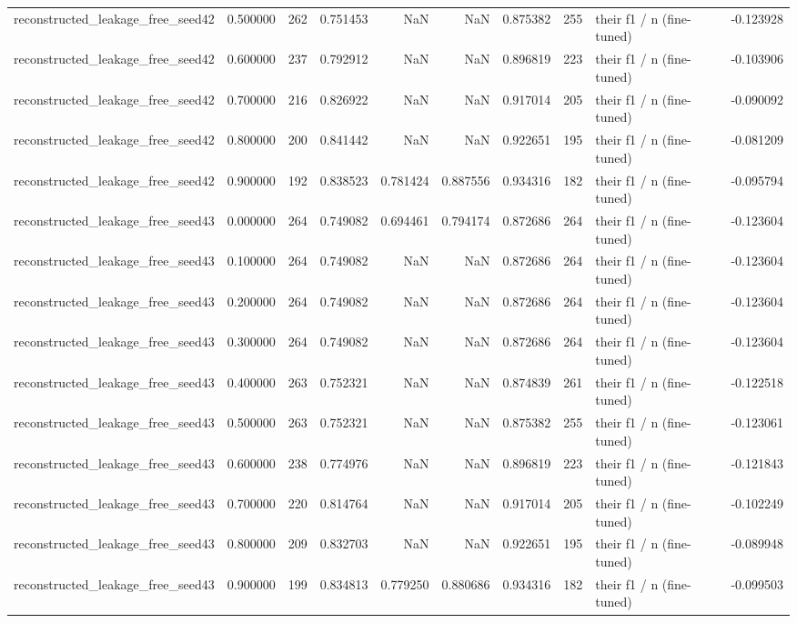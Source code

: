 \begin{tabular}{lrrrrrrrlr}
reconstructed_leakage_free_seed42 & 0.500000 & 262 & 0.751453 & NaN & NaN & 0.875382 & 255 & their f1 / n (fine-tuned) & -0.123928 \\
reconstructed_leakage_free_seed42 & 0.600000 & 237 & 0.792912 & NaN & NaN & 0.896819 & 223 & their f1 / n (fine-tuned) & -0.103906 \\
reconstructed_leakage_free_seed42 & 0.700000 & 216 & 0.826922 & NaN & NaN & 0.917014 & 205 & their f1 / n (fine-tuned) & -0.090092 \\
reconstructed_leakage_free_seed42 & 0.800000 & 200 & 0.841442 & NaN & NaN & 0.922651 & 195 & their f1 / n (fine-tuned) & -0.081209 \\
reconstructed_leakage_free_seed42 & 0.900000 & 192 & 0.838523 & 0.781424 & 0.887556 & 0.934316 & 182 & their f1 / n (fine-tuned) & -0.095794 \\
reconstructed_leakage_free_seed43 & 0.000000 & 264 & 0.749082 & 0.694461 & 0.794174 & 0.872686 & 264 & their f1 / n (fine-tuned) & -0.123604 \\
reconstructed_leakage_free_seed43 & 0.100000 & 264 & 0.749082 & NaN & NaN & 0.872686 & 264 & their f1 / n (fine-tuned) & -0.123604 \\
reconstructed_leakage_free_seed43 & 0.200000 & 264 & 0.749082 & NaN & NaN & 0.872686 & 264 & their f1 / n (fine-tuned) & -0.123604 \\
reconstructed_leakage_free_seed43 & 0.300000 & 264 & 0.749082 & NaN & NaN & 0.872686 & 264 & their f1 / n (fine-tuned) & -0.123604 \\
reconstructed_leakage_free_seed43 & 0.400000 & 263 & 0.752321 & NaN & NaN & 0.874839 & 261 & their f1 / n (fine-tuned) & -0.122518 \\
reconstructed_leakage_free_seed43 & 0.500000 & 263 & 0.752321 & NaN & NaN & 0.875382 & 255 & their f1 / n (fine-tuned) & -0.123061 \\
reconstructed_leakage_free_seed43 & 0.600000 & 238 & 0.774976 & NaN & NaN & 0.896819 & 223 & their f1 / n (fine-tuned) & -0.121843 \\
reconstructed_leakage_free_seed43 & 0.700000 & 220 & 0.814764 & NaN & NaN & 0.917014 & 205 & their f1 / n (fine-tuned) & -0.102249 \\
reconstructed_leakage_free_seed43 & 0.800000 & 209 & 0.832703 & NaN & NaN & 0.922651 & 195 & their f1 / n (fine-tuned) & -0.089948 \\
reconstructed_leakage_free_seed43 & 0.900000 & 199 & 0.834813 & 0.779250 & 0.880686 & 0.934316 & 182 & their f1 / n (fine-tuned) & -0.099503 \\

\end{tabular}
